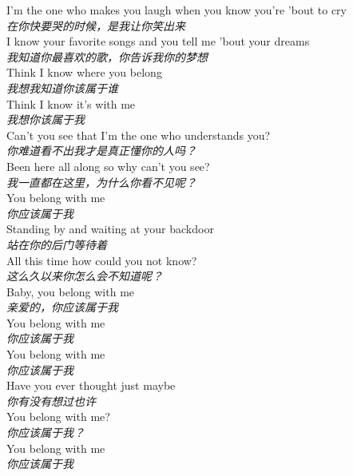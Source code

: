 \begin{spacing}{1.5}
\begin{flushleft}
I'm the one who makes you laugh when you know you're 'bout to cry\\
\textit{在你快要哭的时候，是我让你笑出来}\\[0.5em]

I know your favorite songs and you tell me 'bout your dreams\\
\textit{我知道你最喜欢的歌，你告诉我你的梦想}\\[0.5em]

Think I know where you belong\\
\textit{我想我知道你该属于谁}\\[0.5em]

Think I know it's with me\\
\textit{我想你该属于我}\\[0.5em]

Can't you see that I'm the one who understands you?\\
\textit{你难道看不出我才是真正懂你的人吗？}\\[0.5em]

Been here all along so why can't you see?\\
\textit{我一直都在这里，为什么你看不见呢？}\\[0.5em]

You belong with me\\
\textit{你应该属于我}\\[0.5em]

Standing by and waiting at your backdoor\\
\textit{站在你的后门等待着}\\[0.5em]

All this time how could you not know?\\
\textit{这么久以来你怎么会不知道呢？}\\[0.5em]

Baby, you belong with me\\
\textit{亲爱的，你应该属于我}\\[0.5em]

You belong with me\\
\textit{你应该属于我}\\[0.5em]

You belong with me\\
\textit{你应该属于我}\\[0.5em]

Have you ever thought just maybe\\
\textit{你有没有想过也许}\\[0.5em]

You belong with me?\\
\textit{你应该属于我？}\\[0.5em]

You belong with me\\
\textit{你应该属于我}\\[0.5em]
\end{flushleft}
\end{spacing} 
